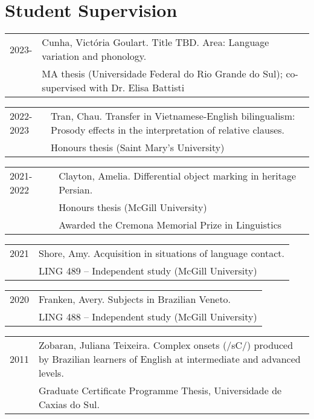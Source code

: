 \documentclass[letterpaper,10pt]{article}
\begin{document}
\section{Student Supervision}


\begin{tabular}{p{1.6cm}p{15.2cm}}	
2023- & Cunha, Vict\'oria Goulart. Title TBD. Area: Language variation and phonology. \\ 
    & MA thesis (Universidade Federal do Rio Grande do Sul); co-supervised with Dr. Elisa Battisti
\end{tabular}

\begin{tabular}{p{1.6cm}p{15.2cm}}	
2022-2023 & Tran, Chau. Transfer in Vietnamese-English bilingualism: Prosody effects in the interpretation of relative clauses. \\ 
    & Honours thesis (Saint Mary's University)
\end{tabular}

\begin{tabular}{p{1.6cm}p{15.2cm}}	
2021-2022 & Clayton, Amelia. Differential object marking in heritage Persian. \\ 
    & Honours thesis (McGill University) \\
    & Awarded the Cremona Memorial Prize in Linguistics
\end{tabular}

\begin{tabular}{p{1.6cm}p{15.2cm}}	
2021 & Shore, Amy. Acquisition in situations of language contact. \\ 
    & LING 489 -- Independent study (McGill University)
\end{tabular}

\begin{tabular}{p{1.6cm}p{15.2cm}}	
2020 & Franken, Avery. Subjects in Brazilian Veneto. \\ 
    & LING 488 -- Independent study (McGill University)
\end{tabular}


\begin{tabular}{p{1.6cm}p{15.2cm}}
 2011 & Zobaran, Juliana Teixeira. Complex onsets (/sC/) produced by Brazilian learners of English at intermediate and advanced levels.\\ 
    & Graduate Certificate Programme Thesis, Universidade de Caxias do Sul.
\end{tabular}
\end{document}
